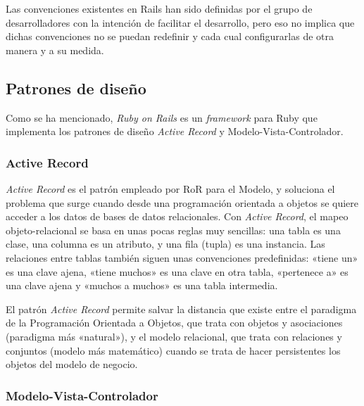     Las convenciones existentes en Rails han sido definidas por el grupo de desarrolladores con la intención de facilitar el desarrollo, pero eso no implica que dichas convenciones no se puedan redefinir y cada cual configurarlas de otra manera y a su medida.

  \subsection{Patrones de diseño} %
    \label{sub:ror_patrones_de_diseno}
    
    Como se ha mencionado, {\it Ruby on Rails} es un {\it framework} para Ruby que implementa los patrones de diseño {\it Active Record} y Modelo-Vista-Controlador.
    
    \subsubsection{Active Record} %
    \label{ssub:ror_active_record}
      
      {\it Active Record} es el patrón empleado por RoR para el Modelo, y soluciona el problema que surge cuando desde una programación orientada a objetos se quiere acceder a los datos de bases de datos relacionales. Con {\it Active Record}, el mapeo objeto-relacional se basa en unas pocas reglas muy sencillas: una tabla es una clase, una columna es un atributo, y una fila (tupla) es una instancia. Las relaciones entre tablas también siguen unas convenciones predefinidas: «tiene un» es una clave ajena, «tiene muchos» es una clave en otra tabla, «pertenece a» es una clave ajena y «muchos a muchos» es una tabla intermedia.
      
      El patrón {\it Active Record} permite salvar la distancia que existe entre el paradigma de la Programación Orientada a Objetos, que trata con objetos y asociaciones (paradigma más «natural»), y el modelo relacional, que trata con relaciones y conjuntos (modelo más matemático) cuando se trata de hacer persistentes los objetos del modelo de negocio.
    
    \subsubsection{Modelo-Vista-Controlador} %
    \label{ssub:modelo_vista_controlador}
    
